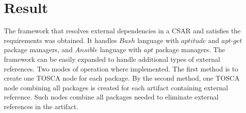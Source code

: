 \section*{Result}
The framework that resolves external dependencies in a CSAR and satisfies the requirements was obtained.
It handles $Bash$ language with $aptitude$ and $apt$-$get$ package managers, and $Ansible$ language with $apt$ package managers.
The framework can be easily expanded to handle additional types of external references. 
Two modes of operation where implemented.
The first method is to create one TOSCA node for each package.
By the second method, one TOSCA node combining all packages is created for each artifact containing external reference.
Such nodes combine all packages needed to eliminate external references in the artifact.